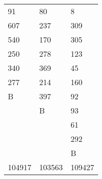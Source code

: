 \documentclass[bwprint]{gmcmthesis}
\numberwithin{equation}{section}
\numberwithin{figure}{section}
\numberwithin{table}{section}
\begin{document}
\begin{table}[htp!]
\begin{minipage}[h]{0.48\linewidth}
\begin{tabularx}{0.9\textwidth}{|Y|Y|Y|}
   91     & 80     & 8   \\
   607    & 237     & 309   \\
   540    & 170    & 305  \\
   250    & 278    & 123  \\
   340    & 369     & 45   \\
   277    & 214    & 160  \\
  B      & 397   & 92 \\
        &  B     &  93      \\
         &         &  61      \\
        &         &   292     \\
        &         &   B     \\
 104917  &  103563  &109427 \\
\hline
\end{tabularx}
\end{minipage}
\end{table}
\end{document}
